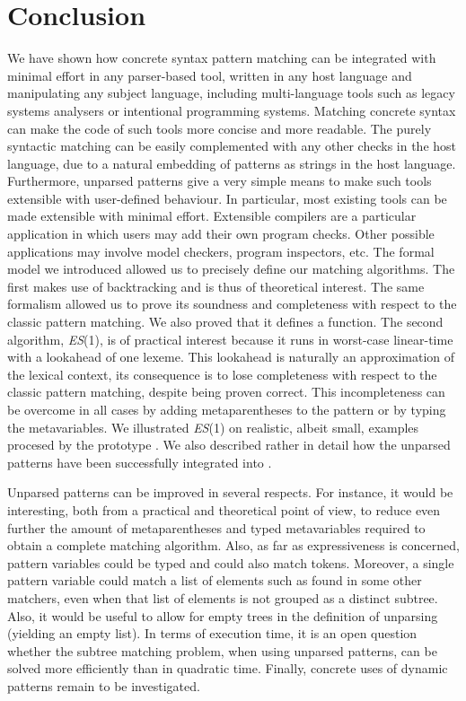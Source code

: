 
\section{Conclusion}
\label{concl}

We have shown how concrete syntax pattern matching can be integrated
with minimal effort in any parser\hyp{}based tool, written in any host
language and manipulating any subject language, including
multi\hyp{}language tools such as legacy systems analysers or
intentional programming systems. Matching concrete syntax can make the
code of such tools more concise and more readable.  The purely
syntactic matching can be easily complemented with any other checks in
the host language, due to a natural embedding of patterns as strings
in the host language. Furthermore, unparsed patterns give a very
simple means to make such tools extensible with user\hyp{}defined
behaviour. In particular, most existing tools can be made extensible
with minimal effort. Extensible compilers are a particular application
in which users may add their own program checks. Other possible
applications may involve model checkers, program inspectors, etc. The
formal model we introduced allowed us to precisely define our matching
algorithms. The first makes use of backtracking and is thus of
theoretical interest. The same formalism allowed us to prove its
soundness and completeness with respect to the classic pattern
matching. We also proved that it defines a function. The second
algorithm, \textit{ES}(1), is of practical interest because it runs in
worst\hyp{}case linear\hyp{}time with a lookahead of one lexeme. This
lookahead is naturally an approximation of the lexical context, its
consequence is to lose completeness with respect to the classic
pattern matching, despite being proven correct. This incompleteness
can be overcome in all cases by adding meta\-parentheses to the
pattern or by typing the meta\-variables. We illustrated
\textit{ES}(1) on realistic, albeit small, examples procesed by the
prototype \Matchbox. We also described rather in detail how the
unparsed patterns have been successfully integrated into \GCC.

Unparsed patterns can be improved in several respects. For instance,
it would be interesting, both from a practical and theoretical point
of view, to reduce even further the amount of meta\-parentheses and
typed meta\-variables required to obtain a complete matching
algorithm. Also, as far as expressiveness is concerned, pattern
variables could be typed and could also match tokens. Moreover, a
single pattern variable could match a list of elements such as found
in some other matchers, even when that list of elements is not grouped
as a distinct subtree. Also, it would be useful to allow for empty
trees in the definition of unparsing (yielding an empty list). In
terms of execution time, it is an open question whether the subtree
matching problem, when using unparsed patterns, can be solved more
efficiently than in quadratic time. Finally, concrete uses of dynamic
patterns remain to be investigated.
